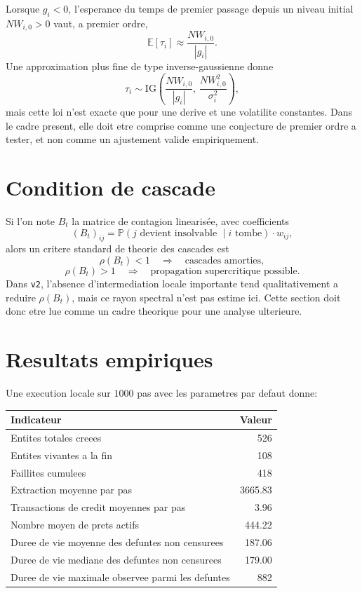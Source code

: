 \documentclass[11pt,a4paper]{article}
\begin{document}
Lorsque $g_i<0$, l'esperance du temps de premier passage depuis un niveau initial $NW_{i,0}>0$ vaut, a premier ordre,
\[
\mathbb{E}[\tau_i] \approx \frac{NW_{i,0}}{|g_i|}.
\]
Une approximation plus fine de type inverse-gaussienne donne
\[
\tau_i \sim \mathrm{IG}\!\left(\frac{NW_{i,0}}{|g_i|},\,\frac{NW_{i,0}^2}{\sigma_i^2}\right),
\]
mais cette loi n'est exacte que pour une derive et une volatilite constantes. Dans le cadre present, elle doit etre comprise comme une conjecture de premier ordre a tester, et non comme un ajustement valide empiriquement.

\section{Condition de cascade}
Si l'on note $B_t$ la matrice de contagion linearisée, avec coefficients
\[
(B_t)_{ij}
=
\mathbb{P}(j \text{ devient insolvable } \mid i \text{ tombe})
\cdot w_{ij},
\]
alors un critere standard de theorie des cascades est
\[
\rho(B_t) < 1 \quad \Rightarrow \quad \text{cascades amorties},
\]
\[
\rho(B_t) > 1 \quad \Rightarrow \quad \text{propagation supercritique possible}.
\]
Dans \texttt{v2}, l'absence d'intermediation locale importante tend qualitativement a reduire $\rho(B_t)$, mais ce rayon spectral n'est pas estime ici. Cette section doit donc etre lue comme un cadre theorique pour une analyse ulterieure.

\section{Resultats empiriques}
Une execution locale sur $1000$ pas avec les parametres par defaut donne:
\begin{center}
\begin{tabular}{lr}
\toprule
Indicateur & Valeur \\
\midrule
Entites totales creees & 526 \\
Entites vivantes a la fin & 108 \\
Faillites cumulees & 418 \\
Extraction moyenne par pas & 3665.83 \\
Transactions de credit moyennes par pas & 3.96 \\
Nombre moyen de prets actifs & 444.22 \\
Duree de vie moyenne des defuntes non censurees & 187.06 \\
Duree de vie mediane des defuntes non censurees & 179.00 \\
Duree de vie maximale observee parmi les defuntes & 882 \\
\bottomrule
\end{tabular}
\end{center}
\end{document}
